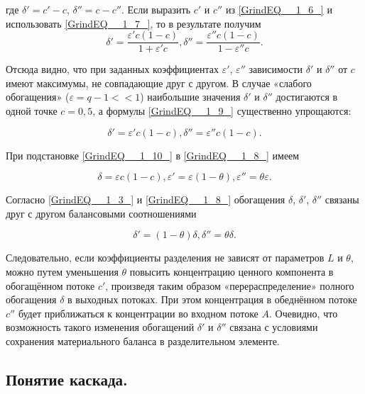 где $\delta '=c'-c$, $\delta ''=c-c''$. Если выразить $c'$ и $c''$ из \ref{GrindEQ__1_6_} и использовать \ref{GrindEQ__1_7_}, то в результате получим
\begin{equation} \label{GrindEQ__1_9_} 
\delta '=\frac{\varepsilon 'c(1-c)}{1+\varepsilon 'c}  ,  \delta ''=\frac{\varepsilon ''c(1-c)}{1-\varepsilon ''c} .              
\end{equation} 

Отсюда видно, что при заданных коэффициентах $\varepsilon '$, $\varepsilon ''$ зависимости $\delta '$ и $\delta ''$ от $c$ имеют максимумы, не совпадающие друг с другом. В случае «слабого обогащения» ($\varepsilon =q-1<<1$) наибольшие значения $\delta '$ и $\delta ''$ достигаются в одной точке $c=0,5$, а формулы \ref{GrindEQ__1_9_} существенно упрощаются:

\begin{equation} \label{GrindEQ__1_10_} 
\delta '=\varepsilon 'c(1-c),  \delta ''=\varepsilon ''c(1-c).              
\end{equation} 

При подстановке \ref{GrindEQ__1_10_} в \ref{GrindEQ__1_8_} имеем

\begin{equation} \label{GrindEQ__1_11_} 
\delta =\varepsilon c(1-c),  \varepsilon '=\varepsilon (1-\theta ), \varepsilon ''=\theta \varepsilon .    
\end{equation} 

Согласно \ref{GrindEQ__1_3_} и \ref{GrindEQ__1_8_} обогащения $\delta $, $\delta '$, $\delta ''$ связаны друг с другом балансовыми соотношениями

\begin{equation} \label{GrindEQ__1_12_} 
\delta '=(1-\theta )\delta ,  \delta ''=\theta \delta .                             
\end{equation} 

Следовательно, если коэффициенты разделения не зависят от параметров $L$ и $\theta $, можно путем уменьшения $\theta $ повысить концентрацию ценного компонента в обогащённом потоке $c'$, произведя таким образом «перераспределение» полного обогащения $\delta $ в выходных потоках. При этом концентрация в обеднённом потоке $c''$ будет приближаться к концентрации во входном потоке $A$. Очевидно, что возможность такого изменения обогащений $\delta '$ и $\delta ''$ связана с условиями сохранения материального баланса в разделительном элементе.

\subsection{Понятие каскада.}


